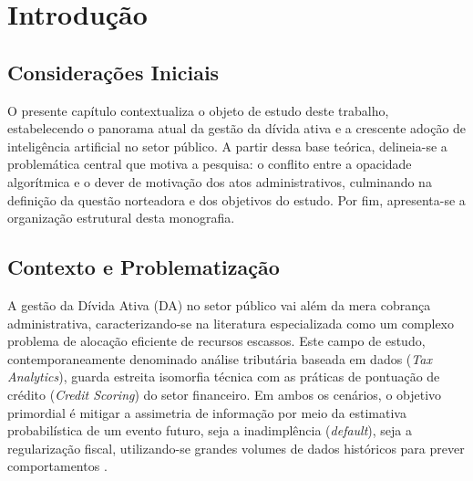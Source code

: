 \chapter{Introdução}
\label{cap:introducao}

\section{Considerações Iniciais}

O presente capítulo contextualiza o objeto de estudo deste trabalho, estabelecendo o panorama atual da gestão da dívida ativa e a crescente adoção de inteligência artificial no setor público. A partir dessa base teórica, delineia-se a problemática central que motiva a pesquisa: o conflito entre a opacidade algorítmica e o dever de motivação dos atos administrativos, culminando na definição da questão norteadora e dos objetivos do estudo. Por fim, apresenta-se a organização estrutural desta monografia.

\section{Contexto e Problematização}

A gestão da Dívida Ativa (DA) no setor público vai além da mera cobrança administrativa, caracterizando-se na literatura especializada como um complexo problema de alocação eficiente de recursos escassos. Este campo de estudo, contemporaneamente denominado análise tributária baseada em dados (\textit{Tax Analytics}), guarda estreita isomorfia técnica com as práticas de pontuação de crédito (\textit{Credit Scoring}) do setor financeiro. Em ambos os cenários, o objetivo primordial é mitigar a assimetria de informação por meio da estimativa probabilística de um evento futuro, seja a inadimplência (\textit{default}), seja a regularização fiscal, utilizando-se grandes volumes de dados históricos para prever comportamentos \cite{changCreditRiskPrediction2024, noriegaMachineLearningCredit2023}.

